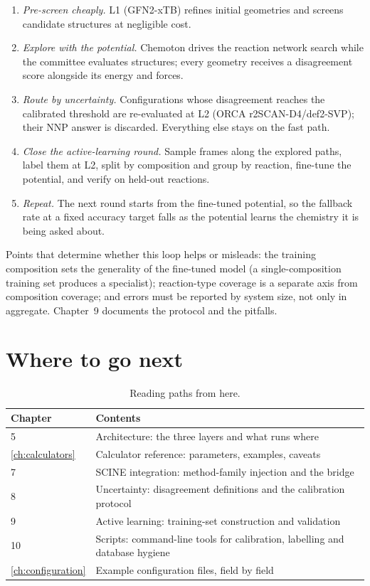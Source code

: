 \begin{enumerate}
  \item \emph{Pre-screen cheaply.}  L1 (GFN2-xTB) refines initial
  geometries and screens candidate structures at negligible cost.
  \item \emph{Explore with the potential.}  Chemoton drives the reaction
  network search while the committee evaluates structures; every geometry
  receives a disagreement score alongside its energy and forces.
  \item \emph{Route by uncertainty.}  Configurations whose disagreement
  reaches the calibrated threshold are re-evaluated at L2 (ORCA
  r2SCAN-D4/def2-SVP); their NNP answer is discarded.  Everything else stays
  on the fast path.
  \item \emph{Close the active-learning round.}  Sample frames along the
  explored paths, label them at L2, split by composition and group by
  reaction, fine-tune the potential, and verify on held-out reactions.
  \item \emph{Repeat.}  The next round starts from the fine-tuned potential,
  so the fallback rate at a fixed accuracy target falls as the potential
  learns the chemistry it is being asked about.
\end{enumerate}

Points that determine whether this loop helps or misleads: the training
composition sets the generality of the fine-tuned model (a single-composition
training set produces a specialist); reaction-type coverage is a separate
axis from composition coverage; and errors must be reported by system size,
not only in aggregate.  Chapter~9 documents the protocol and the pitfalls.

\section{Where to go next}

\begin{table}[htbp]
  \centering
  \small
  \begin{tabularx}{\linewidth}{@{}l X@{}}
    \toprule
    Chapter & Contents \\
    \midrule
    5 & Architecture: the three layers and what runs where \\
    \ref{ch:calculators} & Calculator reference: parameters, examples, caveats \\
    7 & SCINE integration: method-family injection and the bridge \\
    8 & Uncertainty: disagreement definitions and the calibration protocol \\
    9 & Active learning: training-set construction and validation \\
    10 & Scripts: command-line tools for calibration, labelling and database hygiene \\
    \ref{ch:configuration} & Example configuration files, field by field \\
    \bottomrule
  \end{tabularx}
  \caption{Reading paths from here.}
\end{table}
